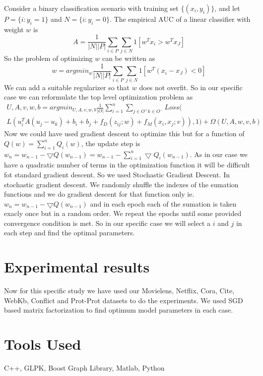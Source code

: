 Consider a binary classification scenario with training set $\lbrace (x_i, y_i) \rbrace$, and let$P = \lbrace i : y_i = 1 \rbrace $ and
$N = \lbrace i : y_i = 0 \rbrace $. The empirical AUC of a linear classifier with weight $w$ is
\begin{equation}
A = \frac{1}{|N||P|} \sum_{i \in P} \sum_{j \in N} 1 [w^T x_i > w^T x_J]
\end{equation}
So the problem of optimizing $w$ can be written as 
\begin{equation}
w = argmin_w \frac{1}{|N||P|} \sum_{i \in P} \sum_{j \in N} 1 [w^T (x_i - x_J) < 0]
\end{equation}
We can add a suitable regularizer so that $w$ does not overfit. So in our specific case we can reformulate the top level optimization problem as
\begin{multline}
U,A,v,w,b = argmin_{U,A,v,w,b} \frac{1}{|O|} \sum\limits_{i=1}^n \sum\limits_{j \in O^{+} k \in O^{-}} Loss( \\
 L(u_i^T A (u_j - u_k) + b_i + b_j + f_D(z_{ij};w) + f_M(x_i,x_j;v)), 1) + \Omega(U,A,w,v,b)
\end{multline}
Now we could have used gradient descent to optimize this but for a function of $Q(w) = \sum\limits_{i = 1}^n Q_i(w)$, the update step is $w_n = w_{n-1}  - \bigtriangledown Q(w_{n-1}) = w_{n-1} - \sum\limits_{i = 1}^n  \bigtriangledown Q_i(w_{n-1})$. As in our case we have a quadratic number of terms in the optimization function it will be difficult fot standard gradient descent. So we used Stochastic Gradient Descent. In stochastic gradient descent.  We randomly shuffle the indexes of the sumation functions and we do gradient descent for that function only ie. $w_n = w_{n-1}  - \bigtriangledown Q(w_{n-1})$ and in each epoch each of the sumation is taken exacly once but in a random order. We repeat the epochs until some provided convergence condition is met. So in our specific case we will select a $i$ and $j$ in each step and find the optimal parameters.

\section*{Experimental results}
Now for this specific study we have used our Movielens, Netflix, Cora, Cite, WebKb, Conflict and Prot-Prot datasets to do the experiments. We used SGD based matrix factorization to find optimum model parameters in each case. 



\section*{Tools Used}
C++, GLPK, Boost Graph Library, Matlab, Python
